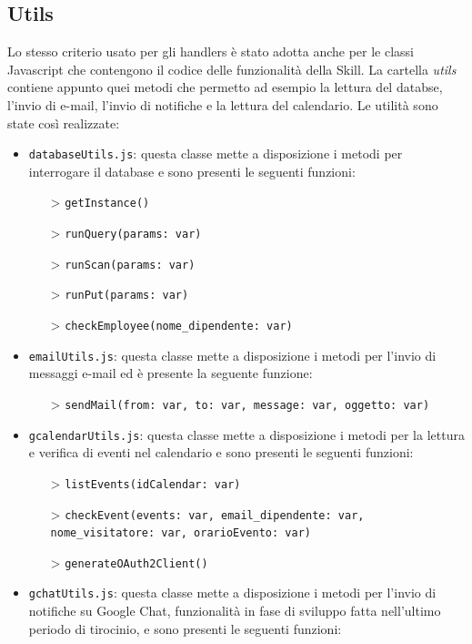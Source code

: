 \subsection{Utils}
\label{utils}
Lo stesso criterio usato per gli handlers è stato adotta anche per le classi Javascript che contengono il codice delle funzionalità della Skill. La cartella \textit{utils} contiene appunto quei metodi che permetto ad esempio la lettura del databse, l'invio di e-mail, l'invio di notifiche e la lettura del calendario. Le utilità sono state così realizzate:
\begin{itemize}
    \item \texttt{databaseUtils.js}: questa classe mette a disposizione i metodi per interrogare il database e sono presenti le seguenti funzioni:
    \begin{itemize}
        \item[>] \texttt{getInstance()}
        \item[>] \texttt{runQuery(params: var)}
        \item[>] \texttt{runScan(params: var)}
        \item[>] \texttt{runPut(params: var)}
        \item[>] \texttt{checkEmployee(nome\_dipendente: var)}
    \end{itemize}
    \item \texttt{emailUtils.js}: questa classe mette a disposizione i metodi per l'invio di messaggi e-mail ed è presente la seguente funzione:
    \begin{itemize}
        \item[>] \texttt{sendMail(from: var, to: var, message: var, oggetto: var)}
    \end{itemize}
    \item \texttt{gcalendarUtils.js}: questa classe mette a disposizione i metodi per la lettura e verifica di eventi nel calendario e sono presenti le seguenti funzioni:
    \begin{itemize}
        \item[>] \texttt{listEvents(idCalendar: var)}
        \item[>] \texttt{checkEvent(events: var, email\_dipendente: var, nome\_visitatore: var, orarioEvento: var)}
        \item[>] \texttt{generateOAuth2Client()}
    \end{itemize}
    \item \texttt{gchatUtils.js}: questa classe mette a disposizione i metodi per l'invio di notifiche su Google Chat, funzionalità in fase di sviluppo fatta nell'ultimo periodo di tirocinio, e sono presenti le seguenti funzioni:

\end{itemize}
